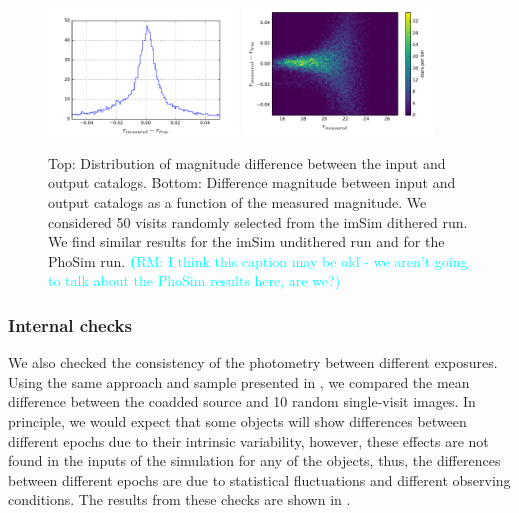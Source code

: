 \documentclass[twocolumn]{aastex62}
\newcommand{\rachel}[1]{{\textcolor{cyan}{{\textbf (RM: #1)}}}}
\begin{document}
\begin{figure}
  \centering
  \includegraphics[width=0.45\textwidth]{photometry_imsim_dithered_50visits_hist}
  \includegraphics[width=0.45\textwidth]{photometry_imsim_dithered_50visits}
  \caption{Top: Distribution of magnitude difference between the input and output catalogs.
  Bottom: Difference magnitude between input and output catalogs as a function of the measured magnitude. We considered 50 visits
  randomly selected from the imSim dithered run. We find similar results for the imSim undithered run and for the PhoSim run. \rachel{I think this caption may be old - we aren't going to talk about the PhoSim results here, are we?}}
  \label{fig:photometry_a}
\end{figure}

\subsubsection{Internal checks}
\label{sec:internal_photometry}

We also checked the consistency of the photometry between different exposures. Using the same approach and sample presented in
, we compared the mean difference between the coadded source and 10 random single-visit images. In
principle, we would expect that some objects will show differences between different epochs due to their intrinsic variability, however,
these effects are not found in the inputs of the simulation for any of the objects, thus, the differences between different epochs are due to
statistical fluctuations and different observing conditions. The results from these checks are shown in .
\end{document}

